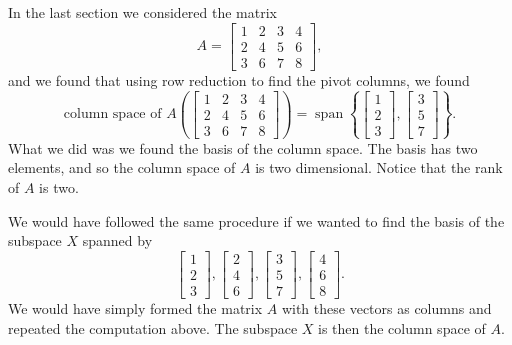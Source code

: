 \begin{example}
In the last section we considered the matrix
\begin{equation*}
A =
\begin{bmatrix}
1 & 2 & 3 & 4 \\
2 & 4 & 5 & 6 \\
3 & 6 & 7 & 8
\end{bmatrix} ,
\end{equation*}
and we found that using row reduction to find the pivot columns, we found
\begin{equation*}
\text{column space of $A$} \left(
\begin{bmatrix}
1 & 2 & 3 & 4 \\
2 & 4 & 5 & 6 \\
3 & 6 & 7 & 8
\end{bmatrix} 
\right)
=
\operatorname{span}
\left\{
\begin{bmatrix}
1 \\
2 \\
3 
\end{bmatrix} 
,
\begin{bmatrix}
3 \\
5 \\
7 
\end{bmatrix} 
\right\} .
\end{equation*}
What we did was we found the basis of the column space.
The basis has two elements, and so the column space of $A$ is two dimensional.
Notice that the rank of $A$ is two.
\end{example}

We would have followed the same procedure if we wanted to find the basis of
the subspace $X$ spanned by
\begin{equation*}
\begin{bmatrix}
1 \\
2 \\
3 
\end{bmatrix} 
,
\begin{bmatrix}
2 \\
4 \\
6 
\end{bmatrix} 
,
\begin{bmatrix}
3 \\
5 \\
7 
\end{bmatrix} 
,
\begin{bmatrix}
4 \\
6 \\
8 
\end{bmatrix}
.
\end{equation*}
We would have simply formed the matrix $A$ with these vectors as columns
and repeated the computation above.  The subspace $X$ is then the column space of
$A$.

